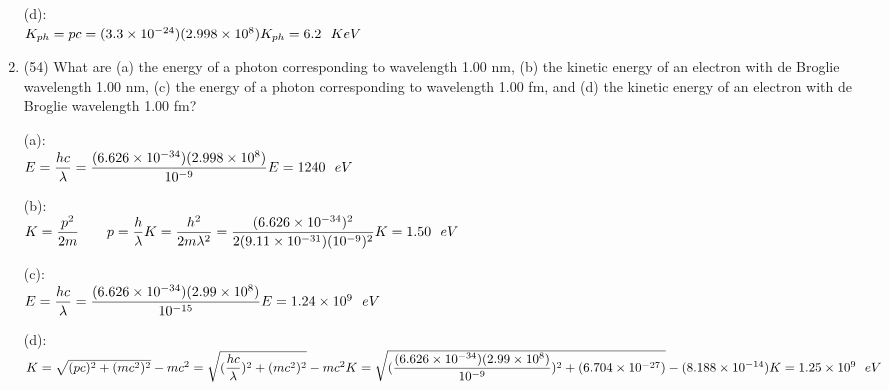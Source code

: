 \documentclass[fleqn]{article}
\begin{document}
\begin{enumerate}
      \textcolor{hwColor}{
        (d): \\
        $
          K_{ph}=pc=(3.3 \times 10^{-24})(2.998 \times 10^8) \\
          \\
          K_{ph}=6.2 ~~ KeV
        $
      }

    \item (54) What are (a) the energy of a photon corresponding to wavelength 1.00 nm, (b) the kinetic energy of an electron with de
    Broglie wavelength 1.00 nm, (c) the energy of a photon corresponding to wavelength 1.00 fm, and (d) the kinetic energy of an
    electron with de Broglie wavelength 1.00 fm?

      \textcolor{hwColor}{
        (a): \\
        $
          E=\dfrac{hc}{\lambda}=\dfrac{(6.626 \times 10^{-34})(2.998 \times 10^8)}{10^{-9}} \\
          \\
          E=1240 ~~ eV \\
        $
      }

      \textcolor{hwColor}{
        (b): \\
        $
          K=\dfrac{p^2}{2m} ~~~~~~ p=\dfrac{h}{\lambda} \\
          \\
          K=\dfrac{h^2}{2m \lambda^2}=\dfrac{(6.626 \times 10^{-34})^2}{2(9.11 \times 10^{-31})(10^{-9})^2} \\
          \\
          K=1.50 ~~ eV \\
        $
      }

      \textcolor{hwColor}{
        (c): \\
        $
          E=\dfrac{hc}{\lambda}=\dfrac{(6.626 \times 10^{-34})(2.99 \times 10^8)}{10^{-15}} \\
          \\
          E=1.24 \times 10^9 ~~ eV \\
        $
      }

      \textcolor{hwColor}{
        (d): \\
        $
          K=\sqrt{(pc)^2+(mc^2)^2}-mc^2=\sqrt{(\dfrac{hc}{\lambda})^2+(mc^2)^2}-mc^2 \\
          \\
          K=\sqrt{(\dfrac{(6.626 \times 10^{-34})(2.99 \times 10^8)}{10^{-9}})^2+(6.704 \times 10^{-27})}-(8.188 \times 10^{-14}) \\
          \\
          K=1.25 \times 10^9 ~~ eV
        $
      }


\end{enumerate}
\end{document}

